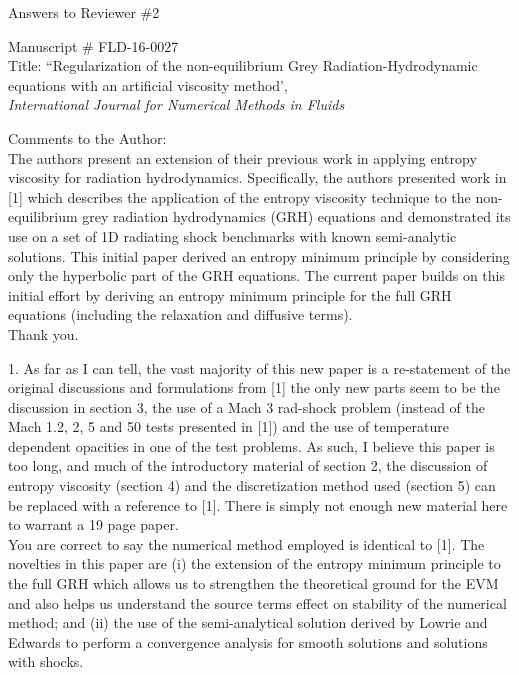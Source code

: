 \documentclass{article}
\begin{document}
\begin{center}
{ \Large Answers to Reviewer \#2}
\end{center}

\bigskip

\noindent Manuscript \# FLD-16-0027 \\
Title: ``Regularization of the non-equilibrium Grey Radiation-Hydrodynamic equations with an artificial viscosity method', \\
{\it International Journal for Numerical Methods in Fluids}\\

\bigskip
\bigskip

{\color{blue}
Comments to the Author: \\ 
The authors present an extension of their previous work in applying entropy viscosity for radiation hydrodynamics. Specifically, the authors presented work in [1] which describes the application of the entropy viscosity technique to the non-equilibrium grey radiation hydrodynamics (GRH) equations and demonstrated its use on a set of 1D radiating shock benchmarks with known semi-analytic solutions. This initial paper derived an entropy minimum principle by considering only the hyperbolic part of the GRH equations. The current paper builds on this initial effort by deriving an entropy minimum principle for the full GRH equations (including the relaxation and diffusive terms).\\}
Thank you.
\bigskip

{\color{blue}
1. As far as I can tell, the vast majority of this new paper is a re-statement of the original discussions and formulations from [1]  the only new parts seem to be the discussion in section 3, the use of a Mach 3 rad-shock problem (instead of the Mach 1.2, 2, 5 and 50 tests presented in [1]) and the use of temperature dependent opacities in one of the test problems. As such, I believe this paper is too long, and much of the introductory material of section 2, the discussion of entropy viscosity (section 4) and the discretization method used (section 5) can be replaced with a reference to [1]. There is simply not enough new material here to warrant a 19 page paper. \\}
You are correct to say the numerical method employed is identical to [1]. The novelties in this paper are (i) the extension of the entropy minimum principle to the full GRH which allows us to strengthen the theoretical ground for the EVM and also helps us understand the source terms effect on stability of the numerical method; and (ii) the use of the semi-analytical solution derived by Lowrie and Edwards to perform a convergence analysis for smooth solutions and solutions with shocks.
\end{document}
